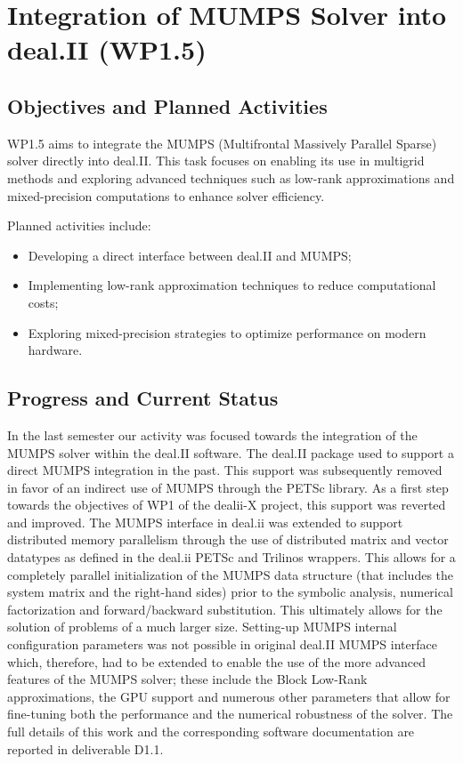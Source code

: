 \documentclass[a4paper,12pt]{article}
\begin{document}
\section{Integration of MUMPS Solver into deal.II (WP1.5)}
    \subsection{Objectives and Planned Activities}
    WP1.5 aims to integrate the MUMPS (Multifrontal Massively Parallel Sparse) solver directly into deal.II. This task focuses on enabling its use in multigrid methods and exploring advanced techniques such as low-rank approximations and mixed-precision computations to enhance solver efficiency.

    Planned activities include:
    \begin{itemize}
        \item Developing a direct interface between deal.II and MUMPS;
        \item Implementing low-rank approximation techniques to reduce computational costs;
        \item Exploring mixed-precision strategies to optimize performance on modern hardware.
    \end{itemize}

    \subsection{Progress and Current Status}
  In the last semester our activity was focused towards the integration of the MUMPS solver within the deal.II software. The deal.II package used to support a direct MUMPS integration in the past. This support was subsequently removed in favor of an indirect use of MUMPS through the PETSc library. As a first step towards the objectives of WP1 of the dealii-X
project, this support was reverted and improved. The MUMPS interface in deal.ii was extended to support distributed memory parallelism through the use of distributed matrix and vector datatypes as defined in the deal.ii PETSc and Trilinos wrappers. This allows for a completely parallel initialization of the MUMPS data structure (that includes the system matrix and the right-hand sides) prior to the symbolic analysis, numerical factorization and forward/backward substitution. This ultimately allows for the solution of problems of a much larger size. Setting-up MUMPS internal configuration parameters was not possible in original
deal.II MUMPS interface which, therefore, had to be extended to enable the use of the more advanced features of the MUMPS solver; these include the Block Low-Rank approximations, the GPU support and numerous other parameters that allow for fine-tuning both the performance and the numerical robustness of the solver. The full details of this work and the corresponding software documentation are reported in deliverable D1.1.


%

    
\end{document}
